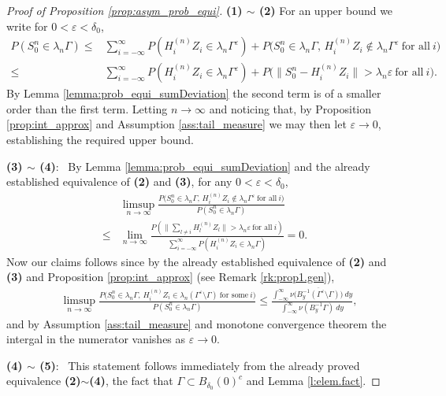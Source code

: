 \documentclass[11pt,reqno]{amsart}
\numberwithin{equation}{section}
\theoremstyle{definition}
\theoremstyle{remark}
\theoremstyle{definition}
\newcommand{\eps}{\varepsilon}
\begin{document}
\begin{proof}[Proof of Proposition \ref{prop:asym_prob_equi}] {\bf (1) $\sim$ (2)}
For an upper bound we write for $0<\eps<\delta_0$, 
\begin{equation*}\label{eq:prop_asymUB}
\begin{aligned}
    P(S_0^n \in \lambda_n \Gamma) \leq &\sum_{i = -\infty}^{\infty}
    P(H_i^{(n)}Z_i \in \lambda_n \Gamma^\eps) + P\bigl(S_0^n \in
    \lambda_n \Gamma, \, H_i^{(n)} Z_i \not \in \lambda_n
    \Gamma^{\eps} \  \text{for all} \  i\bigr) \\
    \leq & \sum_{i = -\infty}^{\infty} P(H_i^{(n)}Z_i \in
    \lambda_n\Gamma^\eps) +
    P\bigl(\|S_0^n - H_i^{(n)}Z_i\| > \lambda_n \eps \ \text{for all} \
    i\bigr). 
\end{aligned}
\end{equation*}
By Lemma \ref{lemma:prob_equi_sumDeviation} the second term is of a smaller order than
the first term.  Letting $n\to\infty$ and noticing that, by Proposition
\ref{prop:int_approx}  and Assumption \ref{ass:tail_measure} we may
then let $\eps\to 0$, establishing the required upper bound. 

 {\bf (3) $\sim$ (4)}: \ By Lemma \ref{lemma:prob_equi_sumDeviation}
 and the already established equivalence of {\bf (2)} and {\bf (3)}, 
for any $0<\eps<\delta_0$, 
\begin{align*}
   & \limsup_{n\to \infty} \frac{P\bigl(S_0^n\in
     \lambda_n\Gamma, \,  {H_i^{(n)}} Z_i \not \in   \lambda_n
     \Gamma^\eps \ \text{for all} \  i   \bigr)}{P(S_0^n\in \lambda_n\Gamma)}\\
    \leq&  \lim_{n\to \infty} \frac{P(\|\sum_{l\neq i} H_l^{(n)}Z_l\|>
     \lambda_n \eps \ \text{for all}\  i)}{\sum_{i =-\infty}^{\infty} P(H_i^{(n)} Z_i
     \in \lambda_n \Gamma)}  = 0. 
\end{align*}
Now our claims follows since by the already established equivalence
of {\bf (2)} and {\bf (3)} and Proposition \ref{prop:int_approx}  (see
Remark \ref{rk:prop1.gen}), 
\begin{align*}
     & \limsup_{n\to \infty}  \frac{P\bigl(S_0^n\in
     \lambda_n\Gamma, \,  {H_i^{(n)}} Z_i  \in   \lambda_n
     (\Gamma^\eps\setminus \Gamma) \ \text{for some} \  i   \bigr)}{P(S_0^n\in
       \lambda_n\Gamma)}  
  \leq  \frac{ \int_{-\infty}^\infty \nu\bigl( \overline{B_y^{-1} (\Gamma^\eps\setminus\Gamma)}\bigr) \ dy}
         { \int_{-\infty}^\infty \nu( B_y^{-1} \Gamma) \ dy}, 
\end{align*}
and by Assumption \ref{ass:tail_measure} and monotone convergence
theorem  the intergal in the numerator vanishes as $\eps\to 0$. 
  


 {\bf (4) $\sim$ (5)}: \ This statement follows immediately from the
already proved equivalence {\bf (2)}$\sim${\bf (4)}, the fact that
$\Gamma \subset B_{\delta_0}(0)^c$ and Lemma \ref{l:elem.fact}.
\end{proof}
\end{document}
